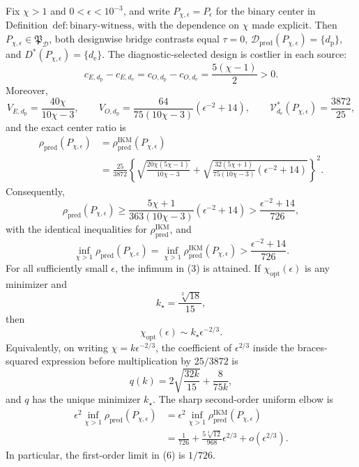 Fix \(\chi>1\) and \(0<\epsilon<10^{-3}\), and write \(P_{\chi,\epsilon}=P_\epsilon\) for the binary center in Definition~\(\mathrm{def{:}binary\text{-}witness}\), with the dependence on \(\chi\) made explicit. Then \(P_{\chi,\epsilon}\in\mathfrak P_{\mathcal D}\), both designwise bridge contrasts equal \(\tau=0\), \(\mathcal D_{\mathrm{pred}}(P_{\chi,\epsilon})=\{d_{\mathrm p}\}\), and \(D^*(P_{\chi,\epsilon})=\{d_{\mathrm e}\}\). The diagnostic-selected design is costlier in each source:
\[
 c_{E,d_{\mathrm p}}-c_{E,d_{\mathrm e}}
 =c_{O,d_{\mathrm p}}-c_{O,d_{\mathrm e}}
 =\frac{5(\chi-1)}2>0.
\]
Moreover,
\[
 V_{E,d_{\mathrm p}}=\frac{40\chi}{10\chi-3},
 \qquad
 V_{O,d_{\mathrm p}}
 =\frac{64}{75(10\chi-3)}\left(\epsilon^{-2}+14\right),
 \qquad
 \mathcal V_{d_{\mathrm e}}^*(P_{\chi,\epsilon})=\frac{3872}{25},
\]
and the exact center ratio is
\[
\begin{aligned}
 \rho_{\mathrm{pred}}(P_{\chi,\epsilon})
 &=\rho_{\mathrm{pred}}^{\mathrm{IKM}}(P_{\chi,\epsilon})\\
 &=\frac{25}{3872}
 \left\{
 \sqrt{\frac{20\chi(5\chi-1)}{10\chi-3}}
 +\sqrt{\frac{32(5\chi+1)}{75(10\chi-3)}
 \left(\epsilon^{-2}+14\right)}
 \right\}^{2}.                                             \tag{1}
\end{aligned}
\]
Consequently,
\[
 \rho_{\mathrm{pred}}(P_{\chi,\epsilon})
 \ge
 \frac{5\chi+1}{363(10\chi-3)}
 \left(\epsilon^{-2}+14\right)
 >\frac{\epsilon^{-2}+14}{726},                            \tag{2}
\]
with the identical inequalities for \(\rho_{\mathrm{pred}}^{\mathrm{IKM}}\), and
\[
 \inf_{\chi>1}\rho_{\mathrm{pred}}(P_{\chi,\epsilon})
 =\inf_{\chi>1}\rho_{\mathrm{pred}}^{\mathrm{IKM}}(P_{\chi,\epsilon})
 >\frac{\epsilon^{-2}+14}{726}.                            \tag{3}
\]
For all sufficiently small \(\epsilon\), the infimum in (3) is attained. If \(\chi_{\mathrm{opt}}(\epsilon)\) is any minimizer and
\[
 k_\star=\frac{\sqrt[3]{18}}{15},
\]
then
\[
 \chi_{\mathrm{opt}}(\epsilon)
 \sim k_\star\epsilon^{-2/3}.                              \tag{4}
\]
Equivalently, on writing \(\chi=k\epsilon^{-2/3}\), the coefficient of \(\epsilon^{2/3}\) inside the braces-squared expression before multiplication by \(25/3872\) is
\[
 q(k)=2\sqrt{\frac{32k}{15}}+\frac{8}{75k},                \tag{5}
\]
and \(q\) has the unique minimizer \(k_\star\). The sharp second-order uniform elbow is
\[
\begin{aligned}
 \epsilon^2\inf_{\chi>1}\rho_{\mathrm{pred}}(P_{\chi,\epsilon})
 &=\epsilon^2\inf_{\chi>1}\rho_{\mathrm{pred}}^{\mathrm{IKM}}(P_{\chi,\epsilon})\\
 &=\frac1{726}+\frac{5\sqrt[3]{12}}{968}\epsilon^{2/3}
 +o(\epsilon^{2/3}).                                      \tag{6}
\end{aligned}
\]
In particular, the first-order limit in (6) is \(1/726\).